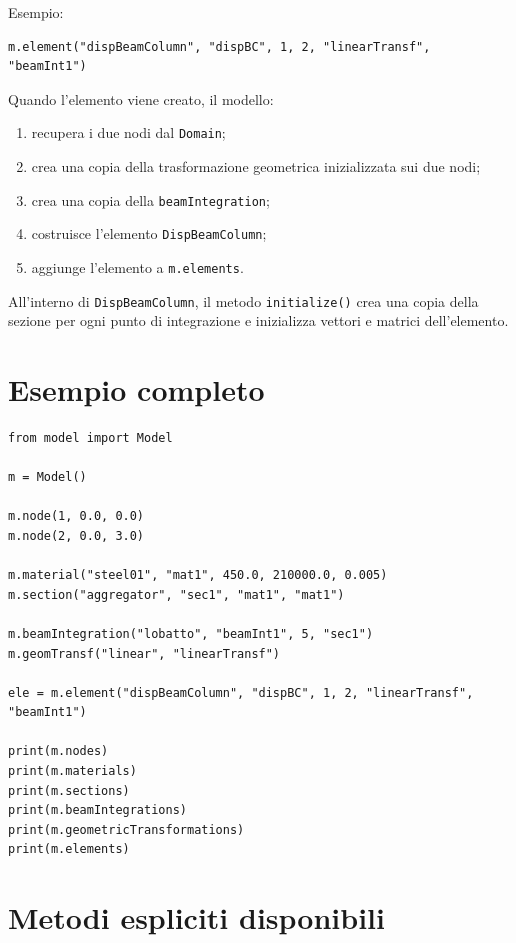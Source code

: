 \documentclass[11pt,a4paper]{article}
\begin{document}
Esempio:

\begin{lstlisting}[style=pythonstyle]
m.element("dispBeamColumn", "dispBC", 1, 2, "linearTransf", "beamInt1")
\end{lstlisting}

Quando l'elemento viene creato, il modello:

\begin{enumerate}
    \item recupera i due nodi dal \texttt{Domain};
    \item crea una copia della trasformazione geometrica inizializzata sui due nodi;
    \item crea una copia della \texttt{beamIntegration};
    \item costruisce l'elemento \texttt{DispBeamColumn};
    \item aggiunge l'elemento a \texttt{m.elements}.
\end{enumerate}

All'interno di \texttt{DispBeamColumn}, il metodo \texttt{initialize()} crea una
copia della sezione per ogni punto di integrazione e inizializza vettori e matrici
dell'elemento.

\section{Esempio completo}

\begin{lstlisting}[style=pythonstyle]
from model import Model

m = Model()

m.node(1, 0.0, 0.0)
m.node(2, 0.0, 3.0)

m.material("steel01", "mat1", 450.0, 210000.0, 0.005)
m.section("aggregator", "sec1", "mat1", "mat1")

m.beamIntegration("lobatto", "beamInt1", 5, "sec1")
m.geomTransf("linear", "linearTransf")

ele = m.element("dispBeamColumn", "dispBC", 1, 2, "linearTransf", "beamInt1")

print(m.nodes)
print(m.materials)
print(m.sections)
print(m.beamIntegrations)
print(m.geometricTransformations)
print(m.elements)
\end{lstlisting}

\section{Metodi espliciti disponibili}
\end{document}
